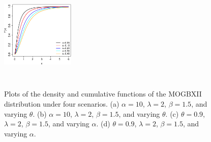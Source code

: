 \documentclass[12pt]{article}
\begin{document}
\begin{figure}[!htb]
\begin{center}
		\includegraphics[width=3.5cm,height=5.5cm]{fda_MOGBXII_variando_alpha.eps}
\caption{Plots of the density and cumulative functions of the MOGBXII distribution under four scenarios. (a) $\alpha=10$, $\lambda=2$,
$\beta=1.5$, and varying $\theta$. (b) $\alpha=10$, $\lambda=2$, $\beta=1.5$, and varying $\theta$.  (c) $\theta=0.9$, $\lambda=2$, $\beta=1.5$, and varying  $\alpha$. (d)
$\theta=0.9$, $\lambda=2$, $\beta=1.5$, and varying  $\alpha$.}
		\label{fdp_e_fda_MOGBXII}
	\end{center}
\end{figure}
\end{document}
